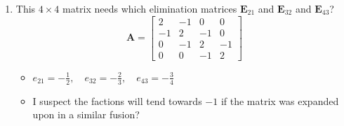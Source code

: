 \begin{itemize}
{\begin{enumerate}
      \item This \(4\times 4 \) matrix needs which elimination matrices \(
        \bm{E}_{21} \) and \( \bm{E}_{32} \) and \(\bm{E}_{43} \)?
       \[
        \bm{A} = \begin{bmatrix}
          2 & -1 & 0 & 0 \\
          -1  & 2 & -1 & 0 \\
          0 & -1 & 2 & -1 \\
          0 & 0 & -1 & 2
        \end{bmatrix}
        \]
        \begin{itemize}\color{foreground}
          \item \( e_{21} = -\frac{1}{2}, \quad e_{32} = -\frac{2}{3}, \quad
            e_{43} = -\frac{3}{4} \)
          \item I suspect the factions will tend towards \( -1 \) if the matrix
            was expanded upon in a similar fusion?
        \end{itemize}

    \end{enumerate}}
    \vspace{16pt}


\end{itemize}
